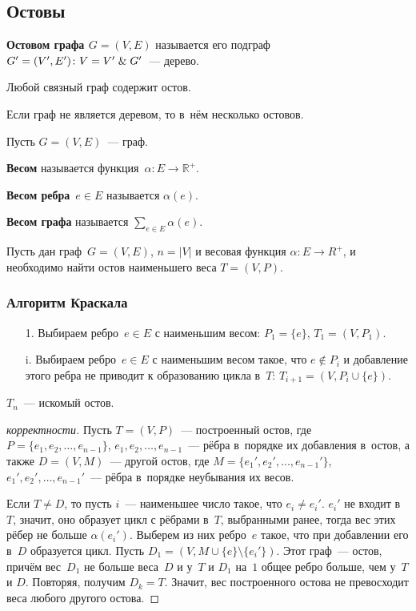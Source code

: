\subsection{Остовы}
 \textbf{Остовом графа $G = (V, E)$} называется его подграф~$G' = (V', E') \colon V = V' \mathrel{\&} G'$~--- дерево.

\begin{statement}
Любой связный граф содержит остов.
\end{statement}

\begin{statement}
Если граф не является деревом, то в~нём несколько остовов.
\end{statement}

Пусть $G = (V, E)$~--- граф.

 \textbf{Весом} называется функция~$\alpha \colon E \to \mathbb R^+$.

\textbf{Весом ребра}~$e \in E$ называется $\alpha(e)$.

\textbf{Весом графа} называется $\displaystyle \sum_{e \in E} \alpha(e)$.

Пусть дан граф~$G = (V, E)$, $n = |V|$ и весовая функция $\alpha \colon E \to R^+$, и необходимо найти остов наименьшего веса $T = (V, P)$.

\subsubsection{Алгоритм Краскала}
\begin{enumerate}
	\item[1.] Выбираем ребро~$e \in E$ с наименьшим весом: $P_1 = \{ e \}$, $T_1 = (V, P_1)$.
	\item[i.] Выбираем ребро~$e \in E$ с наименьшим весом такое, что $e \notin P_i$ и добавление этого ребра не приводит к образованию цикла в~$T$: $T_{i+1} = (V, P_i \cup \{ e \})$.
\end{enumerate}

$T_n$~--- искомый остов.
\begin{proof}[корректности]
	Пусть $T = (V, P)$~--- построенный остов, где
	$P = \{ e_1, e_2, \ldots, e_{n-1} \}$, $e_1, e_2, \ldots, \allowbreak e_{n-1}$~--- рёбра в~порядке их добавления в~остов, а также $D = (V, M)$~--- другой остов, где
	$M = \{ e_1', e_2', \ldots, e_{n-1}' \}$, $e_1', e_2', \ldots, e_{n-1}'$~--- рёбра в~порядке неубывания их весов.
	
	Если $T \neq D$, то пусть $i$~--- наименьшее число такое, что $e_i \neq e_i'$.
	$e_i'$ не входит в~$T$, значит, оно образует цикл с рёбрами в~$T$, выбранными ранее, тогда вес этих рёбер не больше $\alpha(e_i')$.
	Выберем из них ребро~$e$ такое, что при добавлении его в~$D$ образуется цикл.
	Пусть $D_1 = (V, M \cup \{ e \} \setminus \{ e_i' \})$.
	Этот граф~--- остов, причём вес~$D_1$ не больше веса~$D$ и у~$T$ и $D_1$ на~$1$ общее ребро больше, чем у~$T$ и $D$.
	Повторяя, получим $D_k = T$.
	Значит, вес построенного остова не превосходит веса любого другого остова.
\end{proof}

